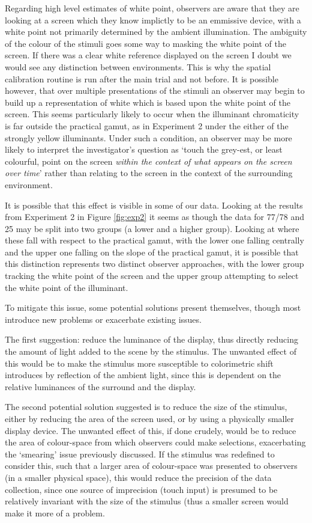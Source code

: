 Regarding high level estimates of white point, observers are aware that they are looking at a screen which they know implictly to be an emmissive device, with a white point not primarily determined by the ambient illumination. The ambiguity of the colour of the stimuli goes some way to masking the white point of the screen. If there was a clear white reference displayed on the screen I doubt we would see any distinction between environments. This is why the spatial calibration routine is run after the main trial and not before. It is possible however, that over multiple presentations of the stimuli an observer may begin to build up a representation of white which is based upon the white point of the screen. This seems particularly likely to occur when the illuminant chromaticity is far outside the practical gamut, as in Experiment 2 under the either of the strongly yellow illuminants. Under such a condition, an observer may be more likely to interpret the investigator's question as `touch the grey-est, or least colourful, point on the screen \emph{within the context of what appears on the screen over time}' rather than relating to the screen in the context of the surrounding environment.

It is possible that this effect is visible in some of our data. Looking at the results from Experiment 2 in Figure \ref{fig:exp2} it seems as though the data for 77/78 and 25 may be split into two groups (a lower and a higher group). Looking at where these fall with respect to the practical gamut, with the lower one falling centrally and the upper one falling on the slope of the practical gamut, it is possible that this distinction represents two distinct observer approaches, with the lower group tracking the white point of the screen and the upper group attempting to select the white point of the illuminant.

To mitigate this issue, some potential solutions present themselves, though most introduce new problems or exacerbate existing issues. 

The first suggestion: reduce the luminance of the display, thus directly reducing the amount of light added to the scene by the stimulus. The unwanted effect of this would be to make the stimulus more susceptible to colorimetric shift introduces by reflection of the ambient light, since this is dependent on the relative luminances of the surround and the display. 

The second potential solution suggested is to reduce the size of the stimulus, either by reducing the area of the screen used, or by using a physically smaller display device. The unwanted effect of this, if done crudely, would be to reduce the area of colour-space from which observers could make selections, exacerbating the `smearing' issue previously discussed. If the stimulus was redefined to consider this, such that a larger area of colour-space was presented to observers (in a smaller physical space), this would reduce the precision of the data collection, since one source of imprecision (touch input) is presumed to be relatively invariant with the size of the stimulus (thus a smaller screen would make it more of a problem.

